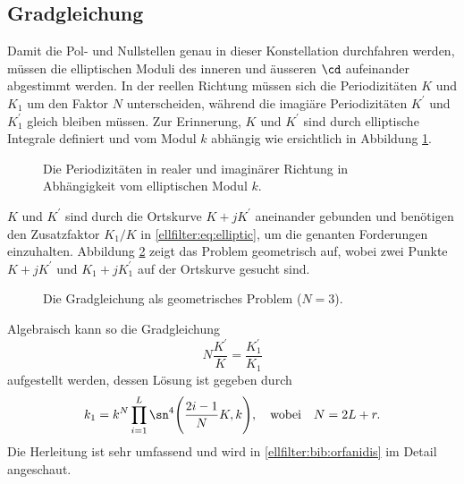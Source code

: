 \subsection{Gradgleichung}

Damit die Pol- und Nullstellen genau in dieser Konstellation durchfahren werden, müssen die elliptischen Moduli des inneren und äusseren $\cd$ aufeinander abgestimmt werden.
In der reellen Richtung müssen sich die Periodizitäten $K$ und $K_1$ um den Faktor $N$ unterscheiden, während die imagiäre Periodizitäten $K^\prime$ und $K^\prime_1$ gleich bleiben müssen.
Zur Erinnerung, $K$ und $K^\prime$ sind durch elliptische Integrale definiert und vom Modul $k$ abhängig wie ersichtlich in Abbildung \ref{ellfilter:fig:kprime}.
\begin{figure}
    \centering
    
    \caption{Die Periodizitäten in realer und imaginärer Richtung in Abhängigkeit vom elliptischen Modul $k$.}
    \label{ellfilter:fig:kprime}
\end{figure}
$K$ und $K^\prime$ sind durch die Ortskurve $K + jK^\prime$ aneinander gebunden und benötigen den Zusatzfaktor $K_1/K$ in \eqref{ellfilter:eq:elliptic}, um die genanten Forderungen einzuhalten.
Abbildung \ref{ellfilter:fig:degree_eq} zeigt das Problem geometrisch auf, wobei zwei Punkte $K+jK^\prime$ und $K_1+jK_1^\prime$ auf der Ortskurve gesucht sind.
\begin{figure}
    \centering
    
    \caption{Die Gradgleichung als geometrisches Problem ($N=3$).}
    \label{ellfilter:fig:degree_eq}
\end{figure}
Algebraisch kann so die Gradgleichung
\begin{equation}
    N \frac{K^\prime}{K} = \frac{K^\prime_1}{K_1}
\end{equation}
aufgestellt werden, dessen Lösung ist gegeben durch
\begin{equation} %
k_1 = k^N \prod_{i=1}^L \sn^4 \Bigg( \frac{2i - 1}{N} K, k \Bigg),
\quad \text{wobei} \quad
N = 2L+r.
\end{equation}
Die Herleitung ist sehr umfassend und wird in \ref{ellfilter:bib:orfanidis} im Detail angeschaut.

%     

